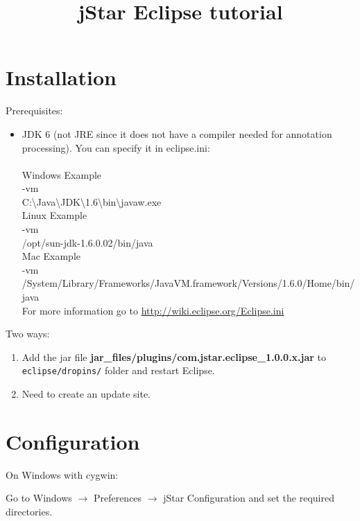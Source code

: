\documentclass{article}
\begin{document}
\title{jStar Eclipse tutorial} 
\maketitle 


\section{Installation}

Prerequisites:
\begin{itemize}
   \item JDK 6 (not JRE since it does not have a compiler needed for annotation processing). You can specify it in eclipse.ini:\\\\
Windows Example\\
-vm\\
C:\textbackslash Java\textbackslash JDK\textbackslash 1.6\textbackslash bin\textbackslash javaw.exe\\

Linux Example\\
-vm\\
/opt/sun-jdk-1.6.0.02/bin/java\\

Mac Example\\
-vm\\
/System/Library/Frameworks/JavaVM.framework/Versions/1.6.0/Home/bin/java\\

For more information go to \href{http://wiki.eclipse.org/Eclipse.ini}{http://wiki.eclipse.org/Eclipse.ini}

\end{itemize}
Two ways:
\begin{enumerate}
\item Add the jar file \textbf{jar\_files/plugins/com.jstar.eclipse\_1.0.0.x.jar} to \texttt{eclipse/dropins/} folder and restart Eclipse.
\item {\color{red} Need to create an update site.}
\end{enumerate}

\section{Configuration}

On Windows with cygwin:

Go to Windows $\rightarrow$ Preferences $\rightarrow$ jStar Configuration and set the required directories.\\
\end{document}
